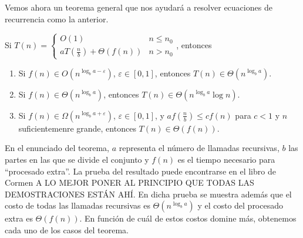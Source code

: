 \documentclass[AL.tex]{subfiles}
\begin{document}
Vemos ahora un teorema general que nos ayudará a resolver ecuaciones de recurrencia como la anterior.

\begin{teorema}

Si $T(n)=\begin{cases}
O(1) & n\leq n_0\\
aT(\frac{n}{b})+\Theta(f(n)) & n> n_0
\end{cases}$, entonces
\begin{enumerate}
\item Si $f(n)\in O(n^{\log_ba-\varepsilon})$, $\varepsilon\in [0,1]$, entonces $T(n)\in\Theta(n^{\log_ba})$.
\item Si $f(n)\in \Theta(n^{\log_ba})$, entonces $T(n)\in\Theta(n^{\log_ba}\log n)$.
\item Si $f(n)\in\Omega(n^{\log_ba+\varepsilon})$, $\varepsilon\in[0,1]$, y $af(\frac{n}{b})\leq cf(n)$ para $c<1$ y $n$ suficientemenre grande, entonces $T(n)\in\Theta(f(n))$. 
\end{enumerate}

\end{teorema}
En el enunciado del teorema, $a$ representa el número de llamadas recursivas, $b$ las partes en las que se divide el conjunto y $f(n)$ es el tiempo necesario para ``procesado extra''. La prueba del resultado puede encontrarse en el libro de Cormen A LO MEJOR PONER AL PRINCIPIO QUE TODAS LAS DEMOSTRACIONES ESTÁN AHÍ. En dicha prueba se muestra además que el costo de todas las llamadas recursivas es $\Theta(n^{\log_ba})$ y el costo del procesado extra es $\Theta(f(n))$. En función de cuál de estos costos domine más, obtenemos cada uno de los casos del teorema. 
\end{document}
